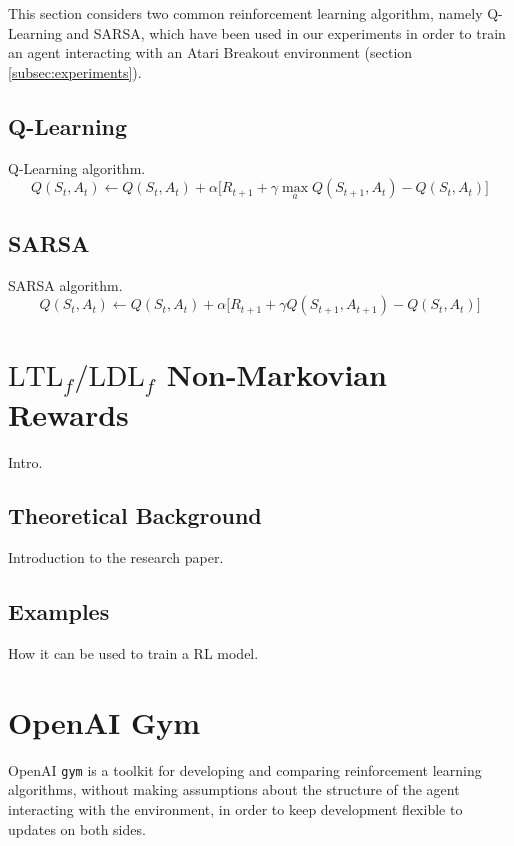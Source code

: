 \documentclass[a4paper]{article}
\begin{document}
This section considers two common reinforcement learning algorithm,
namely Q-Learning and SARSA, which have been used in our experiments
in order to train an agent interacting with an Atari Breakout environment
(section \ref{subsec:experiments}).

\subsection{Q-Learning}
Q-Learning algorithm.
\begin{equation}
    Q(S_t, A_t) \leftarrow Q(S_t, A_t) + \alpha \Big[ R_{t+1} +
        \gamma \max_{a} Q(S_{t+1}, A_t) - Q(S_t, A_t) \Big]
\end{equation}



\subsection{SARSA}
SARSA algorithm.
\begin{equation}
    Q(S_t, A_t) \leftarrow Q(S_t, A_t) + \alpha \Big[ R_{t+1} +
        \gamma Q(S_{t+1}, A_{t+1}) - Q(S_t, A_t) \Big]
\end{equation}



\clearpage
\section{$\text{LTL}_f/\text{LDL}_f$ Non-Markovian Rewards}
Intro.

\subsection{Theoretical Background}
Introduction to the research paper.

\subsection{Examples}
How it can be used to train a RL model.

\clearpage
\section{OpenAI Gym}
OpenAI \texttt{gym} \cite{1606.01540} is a toolkit for developing and comparing
reinforcement learning algorithms, without making assumptions about the
structure of the agent interacting with the environment, in order to
keep development flexible to updates on both sides.
\end{document}
